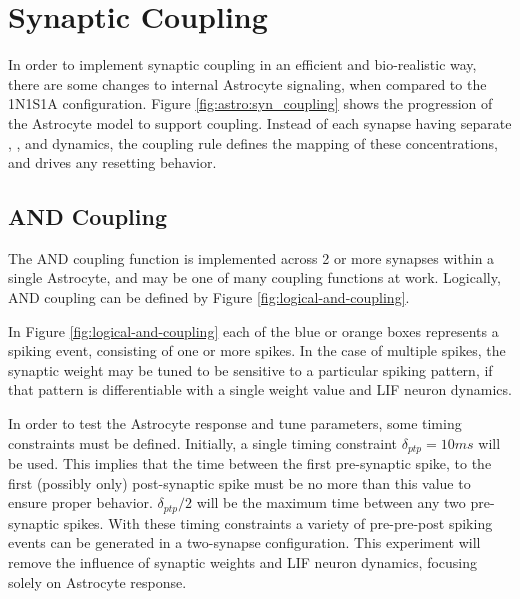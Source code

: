 \section{Synaptic Coupling}
In order to implement synaptic coupling in an efficient and bio-realistic way,
there are some changes to internal Astrocyte signaling, when compared to the
1N1S1A configuration. Figure \ref{fig:astro:syn_coupling} shows the progression
of the Astrocyte model to support coupling. Instead of each synapse having
separate \ipt, \kp, and \ca dynamics, the coupling rule defines the mapping of
these concentrations, and drives any resetting behavior.


\subsection{AND Coupling}

The AND coupling function is implemented across 2 or more synapses within a
single Astrocyte, and may be one of many coupling functions at work. Logically,
AND coupling can be defined by Figure \ref{fig:logical-and-coupling}.


In Figure \ref{fig:logical-and-coupling} each of the blue or orange boxes
represents a spiking event, consisting of one or more spikes. In the case of
multiple spikes, the synaptic weight may be tuned to be sensitive to a
particular spiking pattern, if that pattern is differentiable with a single
weight value and LIF neuron dynamics.

In order to test the Astrocyte response and tune parameters, some timing
constraints must be defined. Initially, a single timing constraint
$\delta_{ptp}=10ms$ will be used. This implies that the time between the
first pre-synaptic spike, to the first (possibly only) post-synaptic spike must
be no more than this value to ensure proper behavior. $\delta_{ptp}/2$ will be
the maximum time between any two pre-synaptic spikes. With these timing
constraints a variety of pre-pre-post spiking events can be generated in a
two-synapse configuration. This experiment will remove the influence of synaptic
weights and LIF neuron dynamics, focusing solely on Astrocyte response.

